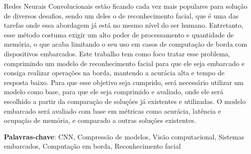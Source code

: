 \setlength{\absparsep}{18pt} %
\begin{resumo}

Redes Neurais Convolucionais estão ficando cada vez mais populares para solução de diversos desafios, sendo um deles
o de reconhecimento facial, que é uma das tarefas onde essa abordagem já está no mesmo nível do ser humano.
Entretanto, esse método costuma exigir um alto poder de processamento e quantidade de memória, o que acaba
limitando o seu uso em casos de computação de borda com dispositivos embarcados.
Este trabalho tem como foco tratar esse problema, comprimindo um modelo de reconhecimento facial para que ele seja
embarcado e consiga realizar operações na borda, mantendo a acurácia alta e tempo de resposta baixo.
Para que esse objetivo seja cumprido, será necessário utilizar um modelo como base, para que ele seja comprimido e
avaliado, onde ele será escolhido a partir da comparação de soluções já existentes e utilizadas.
O modelo embarcado será avaliado com base em métricas como acurácia, latência e ocupação de memória, e comparado a outras
soluções existentes.

 \textbf{Palavras-chave}: CNN, Compressão de modelos, Visão computacional, Sistemas embarcados, Computação em borda,
 Reconhecimento facial
\end{resumo}
